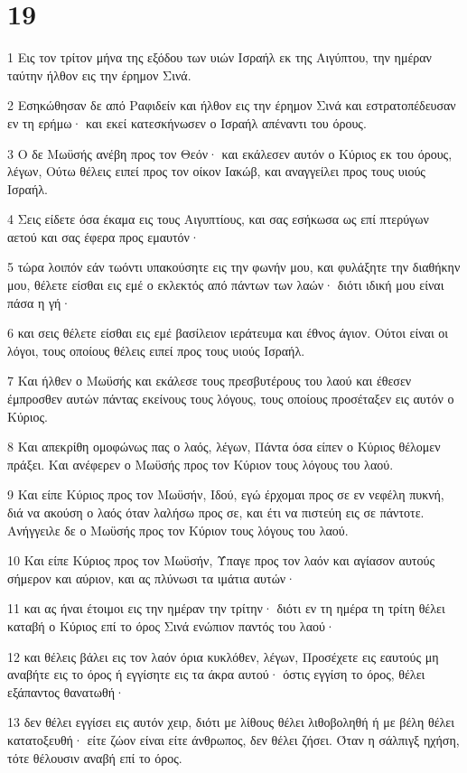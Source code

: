 \chapter{19}

\par 1 Εις τον τρίτον μήνα της εξόδου των υιών Ισραήλ εκ της Αιγύπτου, την ημέραν ταύτην ήλθον εις την έρημον Σινά.
\par 2 Εσηκώθησαν δε από Ραφιδείν και ήλθον εις την έρημον Σινά και εστρατοπέδευσαν εν τη ερήμω· και εκεί κατεσκήνωσεν ο Ισραήλ απέναντι του όρους.
\par 3 Ο δε Μωϋσής ανέβη προς τον Θεόν· και εκάλεσεν αυτόν ο Κύριος εκ του όρους, λέγων, Ούτω θέλεις ειπεί προς τον οίκον Ιακώβ, και αναγγείλει προς τους υιούς Ισραήλ.
\par 4 Σεις είδετε όσα έκαμα εις τους Αιγυπτίους, και σας εσήκωσα ως επί πτερύγων αετού και σας έφερα προς εμαυτόν·
\par 5 τώρα λοιπόν εάν τωόντι υπακούσητε εις την φωνήν μου, και φυλάξητε την διαθήκην μου, θέλετε είσθαι εις εμέ ο εκλεκτός από πάντων των λαών· διότι ιδική μου είναι πάσα η γή·
\par 6 και σεις θέλετε είσθαι εις εμέ βασίλειον ιεράτευμα και έθνος άγιον. Ούτοι είναι οι λόγοι, τους οποίους θέλεις ειπεί προς τους υιούς Ισραήλ.
\par 7 Και ήλθεν ο Μωϋσής και εκάλεσε τους πρεσβυτέρους του λαού και έθεσεν έμπροσθεν αυτών πάντας εκείνους τους λόγους, τους οποίους προσέταξεν εις αυτόν ο Κύριος.
\par 8 Και απεκρίθη ομοφώνως πας ο λαός, λέγων, Πάντα όσα είπεν ο Κύριος θέλομεν πράξει. Και ανέφερεν ο Μωϋσής προς τον Κύριον τους λόγους του λαού.
\par 9 Και είπε Κύριος προς τον Μωϋσήν, Ιδού, εγώ έρχομαι προς σε εν νεφέλη πυκνή, διά να ακούση ο λαός όταν λαλήσω προς σε, και έτι να πιστεύη εις σε πάντοτε. Ανήγγειλε δε ο Μωϋσής προς τον Κύριον τους λόγους του λαού.
\par 10 Και είπε Κύριος προς τον Μωϋσήν, Ύπαγε προς τον λαόν και αγίασον αυτούς σήμερον και αύριον, και ας πλύνωσι τα ιμάτια αυτών·
\par 11 και ας ήναι έτοιμοι εις την ημέραν την τρίτην· διότι εν τη ημέρα τη τρίτη θέλει καταβή ο Κύριος επί το όρος Σινά ενώπιον παντός του λαού·
\par 12 και θέλεις βάλει εις τον λαόν όρια κυκλόθεν, λέγων, Προσέχετε εις εαυτούς μη αναβήτε εις το όρος ή εγγίσητε εις τα άκρα αυτού· όστις εγγίση το όρος, θέλει εξάπαντος θανατωθή·
\par 13 δεν θέλει εγγίσει εις αυτόν χειρ, διότι με λίθους θέλει λιθοβοληθή ή με βέλη θέλει κατατοξευθή· είτε ζώον είναι είτε άνθρωπος, δεν θέλει ζήσει. Όταν η σάλπιγξ ηχήση, τότε θέλουσιν αναβή επί το όρος.

